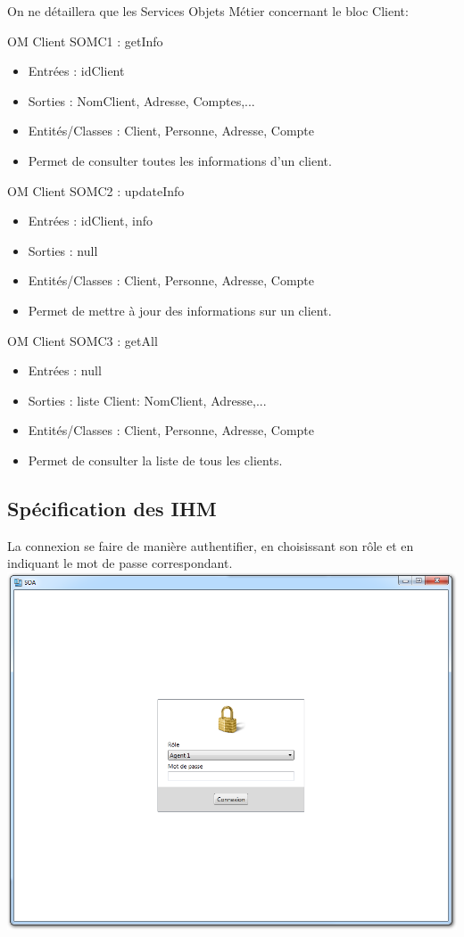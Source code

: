 On ne détaillera que les Services Objets Métier concernant le bloc Client:


OM Client SOMC1 : getInfo
\begin{itemize}
\item Entrées : idClient
\item Sorties : NomClient, Adresse, Comptes,...
\item Entités/Classes : Client, Personne, Adresse, Compte
\item Permet de consulter toutes les informations d'un client.
\end{itemize}

OM Client SOMC2 : updateInfo
\begin{itemize}
\item Entrées : idClient, info
\item Sorties : null
\item Entités/Classes : Client, Personne, Adresse, Compte
\item Permet de mettre à jour des informations sur un client.
\end{itemize}

OM Client SOMC3 : getAll
\begin{itemize}
\item Entrées : null
\item Sorties : liste Client: NomClient, Adresse,...
\item Entités/Classes : Client, Personne, Adresse, Compte
\item Permet de consulter la liste de tous les clients.
\end{itemize}

\subsection{Spécification des IHM}
La connexion se faire de manière authentifier, en choisissant son rôle et en indiquant le mot de passe correspondant.
\includegraphics[width=\textwidth]{../../ihm/pngIHM/login.png}


